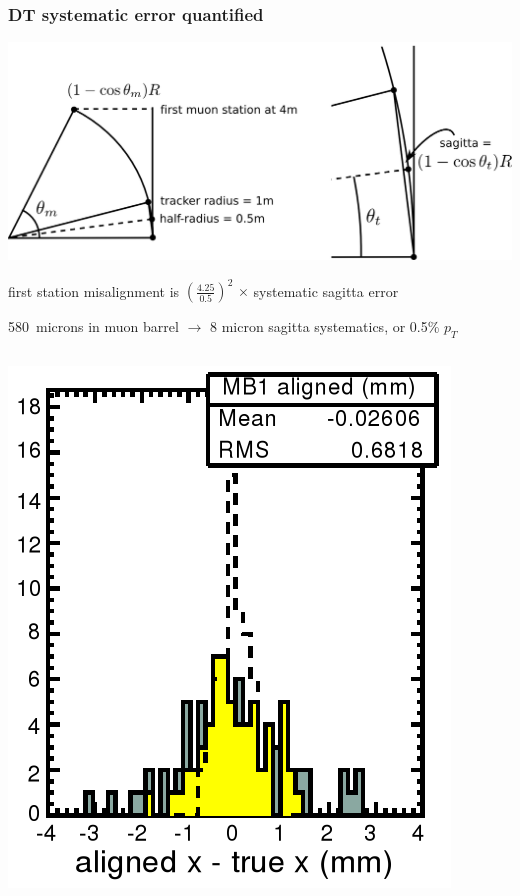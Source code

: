 \documentclass[compress]{beamer}
\begin{document}
\begin{frame}
\frametitle{DT systematic error quantified}
\small

\vspace{-0.75 cm}
\begin{minipage}{\linewidth}
\begin{center}
\includegraphics[width=0.85\linewidth]{curvature_extrapolation.png}

first station misalignment is $\displaystyle \left(\frac{4.25}{0.5}\right)^2$ $\times$ systematic sagitta error
\end{center}

580~microns in muon barrel $\to$ 8 micron sagitta systematics, or 0.5\% $p_T$
\end{minipage}

\vspace{-8.3 cm}
\begin{columns}
\includegraphics[width=\linewidth]{mb1_alignment.png}


\end{columns}
\end{frame}
\end{document}

